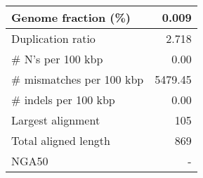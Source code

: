 \documentclass[12pt,a4paper]{article}
\begin{document}
\begin{table}[ht]
\begin{center}
\begin{tabular}{|l*{1}{|r}|}
Genome fraction (\%) & 0.009 \\ \hline
Duplication ratio & 2.718 \\ \hline
\# N's per 100 kbp & 0.00 \\ \hline
\# mismatches per 100 kbp & 5479.45 \\ \hline
\# indels per 100 kbp & 0.00 \\ \hline
Largest alignment & 105 \\ \hline
Total aligned length & 869 \\ \hline
NGA50 & - \\ \hline
\end{tabular}
\end{center}
\end{table}
\end{document}
